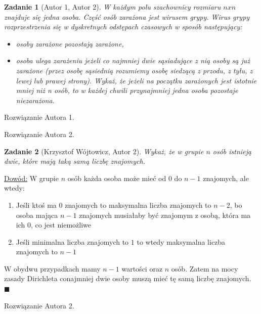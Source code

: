 \documentclass{mwart}
\newtheorem{zad}{Zadanie}[section]
\begin{document}
\begin{zad}[Autor 1, Autor 2]
    W każdym polu szachownicy rozmiaru $n x n $ znajduje się jedna osoba.
    Część osób zarażona jest wirusem grypy. Wirus grypy rozprzestrzenia się w dyskretnych
    odstępach czasowych w sposób następujący:
    \begin{itemize}
        \item osoby zarażone pozostają zarażone,
        \item osoba ulega zarażeniu jeżeli co najmniej dwie sąsiadujące z nią osoby są już zarażone
              (przez osobę sąsiednią rozumiemy osobę siedzącą z przodu, z tyłu, z lewej lub prawej
              strony).
              Wykaż, że jeżeli na początku zarażonych jest istotnie mniej niż n osób, to w każdej chwili
              przynajmniej jedna osoba pozostaje niezarażona.
    \end{itemize}
\end{zad}
\begin{mdframed}
    Rozwiązanie Autora 1.
\end{mdframed}
\begin{mdframed}
    Rozwiązanie Autora 2.
\end{mdframed}




\begin{zad}[Krzysztof Wójtowicz, Autor 2]
    Wykaż, że w grupie $n$ osób istnieją dwie, które mają taką samą liczbę znajomych.
\end{zad}
\begin{mdframed}
    \underline{Dowód:}
    \newline
    W grupie $n$ osób każda osoba może mieć od $0$ do $n-1$ znajomych, ale wtedy:
    \begin{enumerate}
    \item Jeśli ktoś ma $0$ znajomych to maksymalna liczba znajomych to $n-2$, bo osoba mająca $n-1$ znajomych
    musiałaby być znajomym z osobą, która ma ich $0$, co jest niemożliwe
    \item Jeśli minimalna liczba znajomych to $1$ to wtedy maksymalna liczba znajomych to $n-1$
    \end{enumerate}
    W obydwu przypadkach mamy $n-1$ wartości oraz $n$ osób. Zatem na mocy zasady Dirichleta conajmniej dwie
    osoby muszą mieć tę samą liczbę znajomych. 
    $\blacksquare$
\end{mdframed}
\begin{mdframed}
    Rozwiązanie Autora 2.
\end{mdframed}
\end{document}
